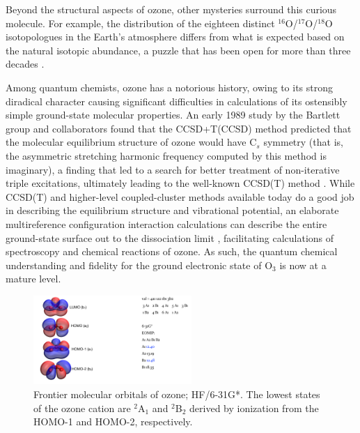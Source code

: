\documentclass[12pt,prb,aps]{revtex4}
\begin{document}
Beyond the structural aspects of ozone, other mysteries surround this
curious molecule. For example, the distribution of the eighteen distinct
$^{16}$O/$^{17}$O/$^{18}$O isotopologues in the Earth's atmosphere differs
from what is expected based on the natural isotopic abundance, a puzzle that
has been open for more than three decades
\cite{Mauersberger:OzoneMystery:1990,Babikov:Ozone:2003}. 

Among quantum chemists, ozone has a notorious history, owing to its strong
diradical character causing significant difficulties in calculations of its
ostensibly simple ground-state molecular properties. An early 1989 study
\cite{Stanton:Ozone:1989, Stanton:Ozone:1989b} by the Bartlett group and
collaborators found that the CCSD+T(CCSD) method predicted that the molecular
equilibrium structure of ozone would have C$_s$ symmetry (that is, the
asymmetric stretching harmonic frequency computed by this method is
imaginary), a finding that led to a search for better treatment of
non-iterative triple excitations, ultimately leading to the well-known CCSD(T)
method \cite{Raghavachari:89, Urban:ccsd(t):1985, GenrefCCSD(T):93}. While
CCSD(T) and higher-level coupled-cluster methods available today
\cite{kucharski:ccsdtq:1992, Kallay:CCHigh, Matthews:ncc:2015} do a good job
in describing the equilibrium structure and vibrational potential, an elaborate multireference configuration interaction calculations can describe 
the entire ground-state surface out to the dissociation limit
\cite{Schinke:Ozone:2001,Babikov:Ozone:2003,Dawes:ozone:2013}, facilitating calculations of spectroscopy and chemical reactions of ozone.
As such, the quantum chemical understanding and
fidelity for the ground electronic state of O$_3$ is now at a mature level.

\begin{figure}[h!]
\includegraphics[width = 6cm]{./figures/MOs.pdf}
\caption{Frontier molecular orbitals of ozone; HF/6-31G*. The lowest states of the ozone 
cation are $^2$A$_1$ and $^2$B$_2$ derived by ionization from the HOMO-1 and HOMO-2, respectively.
    \label{fig:MOs}}
\end{figure}
\end{document}
